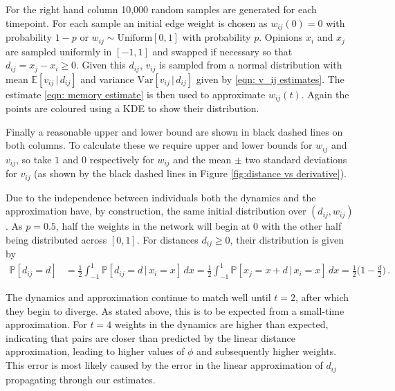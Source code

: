 \documentclass{article}
\newcommand{\var}{\text{Var}}
\begin{document}
For the right hand column 10,000 random samples are generated for each timepoint. For each sample an initial edge weight is chosen as $w_{ij}(0)=0$ with probability $1-p$ or $w_{ij}\sim \text{Uniform}[0,1]$ with probability $p$. Opinions $x_i$ and $x_j$ are sampled uniformly in $[-1,1]$ and swapped if necessary so that $d_{ij} = x_j - x_i \geq 0$. Given this $d_{ij}$, $v_{ij}$ is sampled from a normal distribution with mean $\mathds{E}[v_{ij}\,|\,d_{ij}]$ and variance $\var[v_{ij}\,|\,d_{ij}]$ given by \eqref{eqn: v_ij estimates}. The estimate \eqref{eqn: memory estimate} is then used to approximate $w_{ij}(t)$. Again the points are coloured using a KDE to show their distribution.

Finally a reasonable upper and lower bound are shown in black dashed lines on both columns. To calculate these we require upper and lower bounds for $w_{ij}$ and $v_{ij}$, so take $1$ and $0$ respectively for $w_{ij}$ and the mean $\pm$ two standard deviations for $v_{ij}$ (as shown by the black dashed lines in Figure \ref{fig:distance vs derivative}).

Due to the independence between individuals both the dynamics and the approximation have, by construction, the same initial distribution over $(d_{ij},w_{ij})$. As $p=0.5$, half the weights in the network will begin at $0$ with the other half being distributed across $[0,1]$. For distances $d_{ij}\geq0$, their distribution is given by
\begin{align*}
    \mathbb{P}[d_{ij} =d] 
    &= \frac{1}{2} \int_{-1}^1 \mathbb{P}[d_{ij} =d \, | \, x_i = x] \, dx 
    = \frac{1}{2} \int_{-1}^1 \mathbb{P}[x_j = x +d \, | \, x_i = x] \, dx 
    = \frac{1}{2} \bigg(1 - \frac{d}{2} \bigg) \,.
\end{align*}

The dynamics and approximation continue to match well until $t=2$, after which they begin to diverge. As stated above, this is to be expected from a small-time approximation. For $t=4$ weights in the dynamics are higher than expected, indicating that pairs are closer than predicted by the linear distance approximation, leading to higher values of $\phi$ and subsequently higher weights. This error is most likely caused by the error in the linear approximation of $d_{ij}$ propagating through our estimates. 
\end{document}
